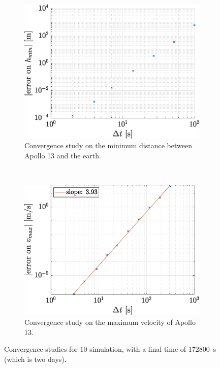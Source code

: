 \documentclass[a4paper,12pt,twoside]{article}
\begin{document}
\begin{figure}[h]
  \centering
  \begin{subfigure}[t]{0.45\textwidth}
    \includegraphics[width=\textwidth]{graphs/ex1b_conv_h.eps}
    \caption{Convergence study on the minimum distance between Apollo 13 and the earth.}
    \label{fig:1b_conv_hmin}
  \end{subfigure}
  ~
  \begin{subfigure}[t]{0.45\textwidth}
    \includegraphics[width=\textwidth]{graphs/ex1b_conv_vel.eps}
    \caption{Convergence study on the maximum velocity of Apollo 13.}
    \label{fig:1b_conv_vmax}
  \end{subfigure}
  \caption{Convergence studies for 10 simulation, with a final time of \SI{172800}{\s} (which is two days).}
  \label{fig:1b_conv}
\end{figure}
\end{document}
